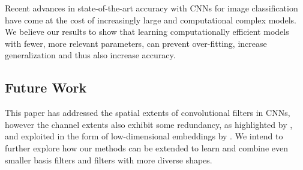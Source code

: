 \documentclass[thesis]{subfiles}
\begin{document}
    Recent advances in state-of-the-art accuracy with CNNs for image classification have come at the cost of increasingly large and computational complex models. We believe our results to show that learning computationally efficient models with fewer, more relevant parameters, can prevent over-fitting, increase generalization and thus also increase accuracy.
    
    \subsection*{Future Work}
    This paper has addressed the spatial extents of convolutional filters in CNNs, however the channel extents also exhibit some redundancy, as highlighted by \citet{journals/corr/JaderbergVZ14}, and exploited in the form of low-dimensional embeddings by \citet{journals/corr/LinCY13,journals/corr/SzegedyLJSRAEVR14}. We intend to further explore how our methods can be extended to learn and combine even smaller basis filters and filters with more diverse shapes.
    
\end{document}

